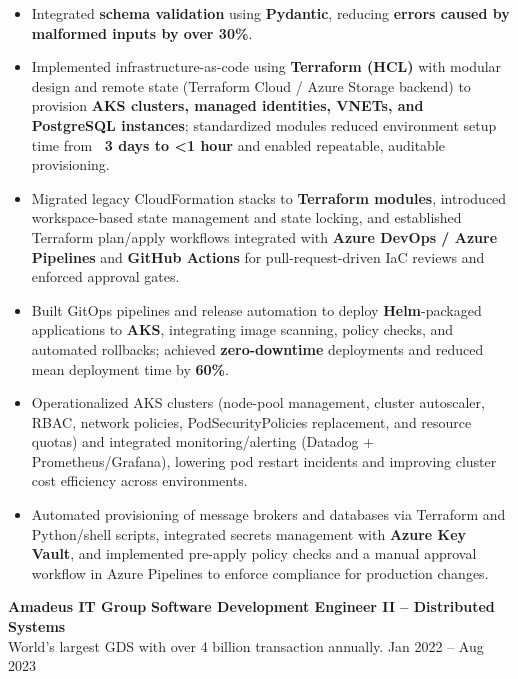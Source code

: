 \documentclass[11 pt]{article}
\begin{document}
\begin{itemize}
  \item Integrated \textbf{schema validation} using \textbf{Pydantic}, reducing \textbf{errors caused by malformed inputs by over 30\%}.

  \item Implemented infrastructure-as-code using \textbf{Terraform (HCL)} with modular design and remote state (Terraform Cloud / Azure Storage backend) to provision \textbf{AKS clusters, managed identities, VNETs, and PostgreSQL instances}; standardized modules reduced environment setup time from \textbf{~3 days to <1 hour} and enabled repeatable, auditable provisioning.

  \item Migrated legacy CloudFormation stacks to \textbf{Terraform modules}, introduced workspace-based state management and state locking, and established Terraform plan/apply workflows integrated with \textbf{Azure DevOps / Azure Pipelines} and \textbf{GitHub Actions} for pull-request-driven IaC reviews and enforced approval gates.

  \item Built GitOps pipelines and release automation to deploy \textbf{Helm}-packaged applications to \textbf{AKS}, integrating image scanning, policy checks, and automated rollbacks; achieved \textbf{zero-downtime} deployments and reduced mean deployment time by \textbf{60\%}.

  \item Operationalized AKS clusters (node-pool management, cluster autoscaler, RBAC, network policies, PodSecurityPolicies replacement, and resource quotas) and integrated monitoring/alerting (Datadog + Prometheus/Grafana), lowering pod restart incidents and improving cluster cost efficiency across environments.

  \item Automated provisioning of message brokers and databases via Terraform and Python/shell scripts, integrated secrets management with \textbf{Azure Key Vault}, and implemented pre-apply policy checks and a manual approval workflow in Azure Pipelines to enforce compliance for production changes.

\end{itemize}

\vspace{6pt}

\noindent
{\normalsize\textbf{Amadeus IT Group}} \hfill \small{\textbf{Software Development Engineer II – Distributed Systems}} \\
{World's largest GDS with over 4 billion transaction annually. \hfill Jan 2022 -- Aug 2023}
\end{document}
